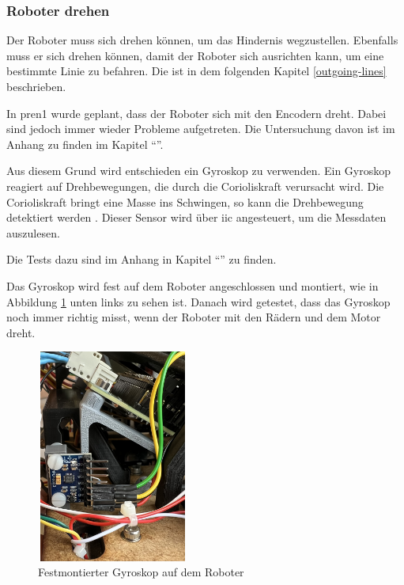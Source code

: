 \subsubsection{Roboter drehen}

Der Roboter muss sich drehen können, um das Hindernis wegzustellen. Ebenfalls muss er sich drehen können, damit der Roboter sich ausrichten kann, um eine bestimmte Linie zu befahren. Die ist in dem folgenden Kapitel \ref{outgoing-lines} beschrieben.

In \acrshort{pren1} wurde geplant, dass der Roboter sich mit den Encodern dreht. Dabei sind jedoch immer wieder Probleme aufgetreten. Die Untersuchung davon ist im Anhang zu finden im Kapitel ``''.

Aus diesem Grund wird entschieden ein Gyroskop zu verwenden.
 Ein Gyroskop reagiert auf Drehbewegungen, die durch die Corioliskraft verursacht wird. Die Corioliskraft bringt eine Masse ins Schwingen, so kann die Drehbewegung detektiert werden \parencite{zielke2025}. Dieser Sensor wird über \acrshort{iic} angesteuert, um die Messdaten auszulesen. 

Die Tests dazu sind im Anhang in Kapitel ``'' zu finden.

Das Gyroskop wird fest auf dem Roboter angeschlossen und montiert, wie in Abbildung \ref{fig:Gyroskop auf dem Roboter} unten links zu sehen ist. Danach wird getestet, dass das Gyroskop noch immer richtig misst, wenn der Roboter mit den Rädern und dem Motor dreht.


\begin{figure}[H]
\centering
\includegraphics[width=5cm, height=7cm]{assets/ET/Gyroskop/Gyro_Montiert.jpeg}
\caption{Festmontierter Gyroskop auf dem Roboter}
\label{fig:Gyroskop auf dem Roboter}
\end{figure}


